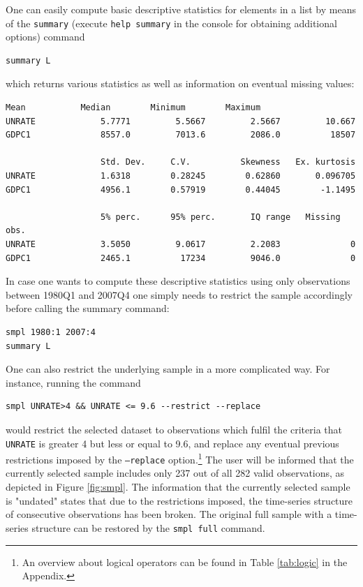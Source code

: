\documentclass[11pt]{article}
\begin{document}
One can easily compute basic descriptive statistics for elements in a list by means of the \texttt{summary} (execute \texttt{help summary} in the console for obtaining additional options) command
\begin{Verbatim}[baselinestretch=0.75, fontsize=\small]
summary L
\end{Verbatim}
which returns various statistics as well as information on eventual missing values:
\begin{Verbatim}[baselinestretch=0.75, fontsize=\small]
                   Mean           Median        Minimum        Maximum
UNRATE             5.7771         5.5667         2.5667         10.667
GDPC1              8557.0         7013.6         2086.0          18507

                   Std. Dev.     C.V.          Skewness   Ex. kurtosis
UNRATE             1.6318        0.28245        0.62860       0.096705
GDPC1              4956.1        0.57919        0.44045        -1.1495

                   5% perc.      95% perc.       IQ range   Missing obs.
UNRATE             3.5050         9.0617         2.2083              0
GDPC1              2465.1          17234         9046.0              0
\end{Verbatim}

In case one wants to compute these descriptive statistics using only observations between 1980Q1 and 2007Q4 one simply needs to restrict the sample accordingly before calling the summary command:
\begin{Verbatim}[baselinestretch=0.75, fontsize=\small]
smpl 1980:1 2007:4
summary L
\end{Verbatim}

One can also restrict the underlying sample in a more complicated way. For instance, running the command 
\begin{Verbatim}[baselinestretch=0.75, fontsize=\small]
smpl UNRATE>4 && UNRATE <= 9.6 --restrict --replace
\end{Verbatim}
would restrict the selected dataset to observations which fulfil the criteria that \texttt{UNRATE} is greater 4 but less or equal to 9.6, and replace any eventual previous restrictions imposed by the \texttt{---replace} option.\footnote{An overview about logical operators can be found in Table \ref{tab:logic} in the Appendix.} The user will be informed that the currently selected sample includes only 237 out of all 282 valid observations, as depicted in Figure \ref{fig:smpl}. The information that the currently selected sample is "undated" states that due to the restrictions imposed, the time-series structure of consecutive observations has been broken. The original full sample with a time-series structure can be restored by the \texttt{smpl full} command.
\end{document}
